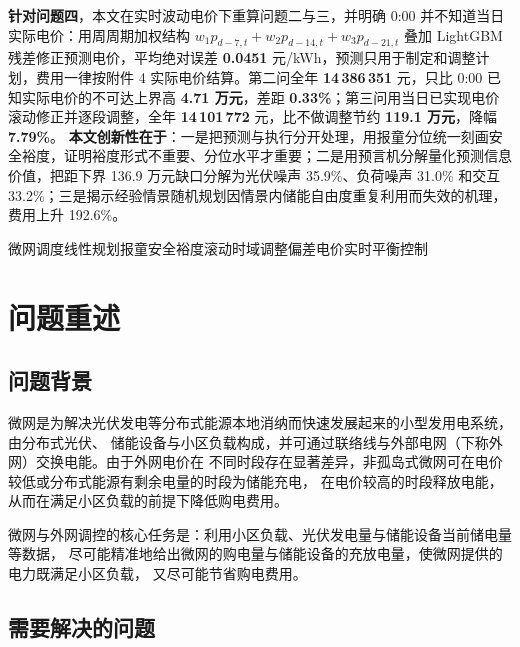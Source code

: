 \documentclass[12pt,a4paper,fontset=fandol]{ctexart}
\newcommand{\cumcmkeywords}[1]{\par\vspace{0.6em}\noindent{\heiti\bfseries 关键词：}#1}
\begin{document}
\textbf{针对问题四}\nobreak，本文在实时波动电价下重算问题二与三\nobreak，并明确 0:00 并不知道当日实际电价\nobreak：用周周期加权结构 $w_1p_{d-7,t}+w_2p_{d-14,t}+w_3p_{d-21,t}$ 叠加 LightGBM 残差修正预测电价\nobreak，平均绝对误差 \textbf{0.0451} 元/kWh\nobreak，预测只用于制定和调整计划\nobreak，费用一律按附件 4 实际电价结算\nobreak。第二问全年 \textbf{14\,386\,351} 元\nobreak，只比 0:00 已知实际电价的不可达上界高 \textbf{4.71 万元}\nobreak，差距 \textbf{0.33\%}\nobreak；第三问用当日已实现电价滚动修正并逐段调整\nobreak，全年 \textbf{14\,101\,772} 元\nobreak，比不做调整节约 \textbf{119.1 万元}\nobreak，降幅 \textbf{7.79\%}\nobreak。
\textbf{本文创新性在于}\nobreak：一是把预测与执行分开处理\nobreak，用报童分位统一刻画安全裕度\nobreak，证明裕度形式不重要\nobreak、分位水平才重要\nobreak；二是用预言机分解量化预测信息价值\nobreak，把距下界 136.9 万元缺口分解为光伏噪声 35.9\%\nobreak、负荷噪声 31.0\% 和交互 33.2\%\nobreak；三是揭示经验情景随机规划因情景内储能自由度重复利用而失效的机理\nobreak，费用上升 192.6\%\nobreak。
\cumcmkeywords{微网调度\enspace 线性规划\enspace 报童安全裕度\enspace 滚动时域调整\enspace 偏差电价\enspace 实时平衡控制}

\newpage

\section{问题重述}

\subsection{问题背景}

微网是为解决光伏发电等分布式能源本地消纳而快速发展起来的小型发用电系统\nobreak，由分布式光伏\nobreak、
储能设备与小区负载构成\nobreak，并可通过联络线与外部电网（下称外网\nobreak）交换电能\nobreak。由于外网电价在
不同时段存在显著差异\nobreak，非孤岛式微网可在电价较低或分布式能源有剩余电量的时段为储能充电\nobreak，
在电价较高的时段释放电能\nobreak，从而在满足小区负载的前提下降低购电费用\nobreak。

微网与外网调控的核心任务是\nobreak：利用小区负载\nobreak、光伏发电量与储能设备当前储电量等数据\nobreak，
尽可能精准地给出微网的购电量与储能设备的充放电量\nobreak，使微网提供的电力既满足小区负载\nobreak，
又尽可能节省购电费用\nobreak。

\subsection{需要解决的问题}
\end{document}
